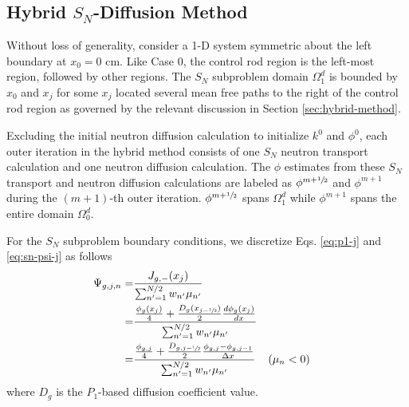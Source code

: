 \subsection{Hybrid $S_N$-Diffusion Method}

Without loss of generality, consider a 1-D system symmetric about the left boundary at $x_0=0$ cm.
Like Case 0, the control rod region is the left-most region, followed by other regions. The $S_N$
subproblem domain $\Omega^d_1$ is bounded by $x_0$ and $x_j$ for some $x_j$
located several mean free paths to the right of the control rod region as governed by the relevant
discussion in Section \ref{sec:hybrid-method}.

Excluding the initial neutron diffusion calculation to initialize $k^0$ and $\phi^0$, each outer
iteration in the hybrid method consists of one $S_N$ neutron transport calculation and one neutron
diffusion calculation. The $\phi$ estimates from these $S_N$ transport and neutron diffusion
calculations are labeled as $\phi^{m+\sfrac{1}{2}}$ and $\phi^{m+1}$ during the
$(m+1)$-th outer iteration. $\phi^{m+\sfrac{1}{2}}$ spans $\Omega^d_1$ while $\phi^{m+1}$ spans
the entire domain $\Omega^d_0$.

For the $S_N$ subproblem boundary conditions, we discretize Eqs. \ref{eq:p1-j} and
\ref{eq:sn-psi-j} as follows
%
\begin{align}
  \Psi_{g,j,n} =& \frac{J_{g,-}(x_j)}{\sum^{N/2}_{n'=1}w_{n'}\mu_{n'}} \nonumber \\
  =& \frac{\frac{\phi_g(x_j)}{4}+
  \frac{D_g(x_{j-\sfrac{1}{2}})}{2}\frac{d\phi_g(x_j)}{dx}}{\sum^{N/2}_{n'=1}w_{n'}\mu_{n'}}
  \nonumber \\
  =& \frac{\frac{\phi_{g,j}}{4}+
  \frac{D_{g,j-\sfrac{1}{2}}}{2}\frac{\phi_{g,j}-\phi_{g,j-1}}{\Delta x}}
    {\sum^{N/2}_{n'=1}w_{n'}\mu_{n'}} && (\mu_n < 0) \label{eq:sn-bc}
\end{align}
%
where $D_g$ is the $P_1$-based diffusion coefficient value.

